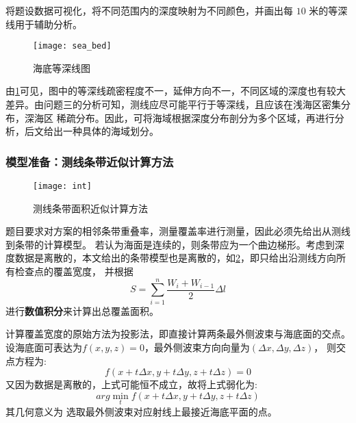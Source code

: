 \documentclass[withoutpreface,bwprint]{cumcmthesis} %
\begin{document}
        将题设数据可视化，将不同范围内的深度映射为不同颜色，并画出每 $10$ 米的等深线用于辅助分析。
        \begin{figure}[H]
            \centering
            \texttt{[image: sea\_bed]}
            \caption{海底等深线图}
            \label{fig:sea_bed}
        \end{figure}
        由\cref{fig:sea_bed}可见，图中的等深线疏密程度不一，延伸方向不一，不同区域的深度也有较大差异。由问题三的分析可知，测线应尽可能平行于等深线，且应该在浅海区密集分布，深海区
        稀疏分布。因此，可将海域根据深度分布剖分为多个区域，再进行分析，后文给出一种具体的海域划分。

        \subsubsection{模型准备：测线条带近似计算方法}
        \begin{figure}[H]
            \centering
            \texttt{[image: int]}
            \caption{测线条带面积近似计算方法}
            \label{fig:int}
        \end{figure}
        题目要求对方案的相邻条带重叠率，测量覆盖率进行测量，因此必须先给出从测线到条带的计算模型。
        若认为海面是连续的，则条带应为一个曲边梯形。考虑到深度数据是离散的，本文给出的条带模型也是离散的，如\cref{fig:int}，即只给出沿测线方向所有检查点的覆盖宽度，
        并根据
        \begin{equation}
            S = \sum\limits_{i=1}^{n} \frac{W_i + W_{i-1}}{2} \Delta l
            \label{eq: cross_point}
        \end{equation}
        进行\textbf{数值积分}来计算出总覆盖面积。

        计算覆盖宽度的原始方法为投影法，即直接计算两条最外侧波束与海底面的交点。
        设海底面可表达为$f(x, y, z) = 0$，最外侧波束方向向量为$(\Delta x, \Delta y, \Delta z) $，
        则交点方程为:
        \begin{equation}
            f(x + t \Delta x, y + t \Delta y, z + t \Delta z) = 0
            \label{eq:cross_point}
        \end{equation}  
        又因为数据是离散的，上式可能恒不成立，故将上式弱化为:
        \begin{equation}
            arg\min_{t} f(x + t \Delta x, y + t \Delta y, z + t \Delta z)
            \label{eq:target_3}
        \end{equation} 
        其几何意义为
        选取最外侧波束对应射线上最接近海底平面的点。
\end{document}
